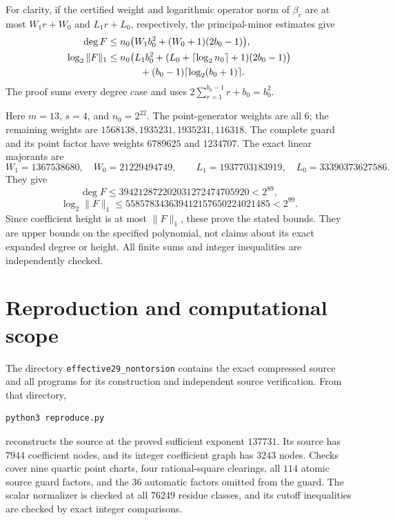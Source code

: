 \documentclass[11pt,a4paper]{article}
\begin{document}
For clarity, if the certified weight and logarithmic operator
norm of $\beta_r$ are at most $W_1r+W_0$ and $L_1r+L_0$,
respectively, the principal-minor estimates give
\begin{align*}
 \deg F&\le n_0\bigl(W_1b_0^2+(W_0+1)(2b_0-1)\bigr),\\
 \log_2\|F\|_1&\le n_0\bigl(L_1b_0^2+
                   (L_0+\lceil\log_2n_0\rceil+1)(2b_0-1)\bigr)\\
 &\hspace{12mm}+(b_0-1)\lceil\log_2(b_0+1)\rceil.
\end{align*}
The proof sums every degree case and uses
$2\sum_{r=1}^{b_0-1}r+b_0=b_0^2$.

Here $m=13$, $s=4$, and $n_0=2^{22}$. The point-generator
weights are all 6; the remaining weights are
$1568138,1935231,1935231,116318$. The complete guard and
its point factor have weights $6789625$ and $1234707$.
The exact linear majorants are
\[
 W_1=1367538680,\quad W_0=21229494749,
 \qquad L_1=1937703183919,\quad L_0=33390373627586.
\]
They give
\[
 \deg F\le394212872202031272474705920<2^{89},
\]
\[
 \log_2\|F\|_1\le558578343639412157650224021485<2^{99}.
\]
Since coefficient height is at most $\|F\|_1$, these prove
the stated bounds. They are upper bounds on the specified
polynomial, not claims about its exact expanded degree or height.
All finite sums and integer inequalities are independently checked.

\section{Reproduction and computational scope}

The directory \texttt{effective29\_nontorsion} contains the exact
compressed source and all programs for its construction and independent
source verification. From that directory,
\begin{verbatim}
python3 reproduce.py
\end{verbatim}
reconstructs the source at the proved sufficient exponent $137731$.
Its source has $7944$ coefficient nodes, and its integer coefficient
graph has $3243$ nodes. Checks cover nine quartic point charts, four
rational-square clearings, all $114$ atomic source guard factors,
and the $36$ automatic factors omitted from the guard. The scalar
normalizer is checked at all $76249$ residue classes, and its cutoff
inequalities are checked by exact integer comparisons.
\end{document}
